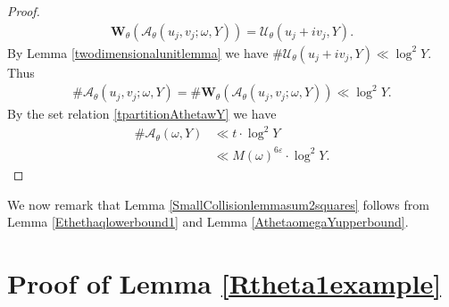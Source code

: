 \documentclass[12pt]{amsart}
\newcommand{\1}{\mathmybb{1}}
\begin{document}
\begin{proof}
\begin{align*}
\mathbf{W}_{\theta}(\mathcal{A}_{\theta}(u_{j},v_{j};\omega,Y)) = \mathcal{U}_{\theta}(u_{j}+iv_{j},Y).
\end{align*}
By Lemma \ref{twodimensionalunitlemma} we have $\#\mathcal{U}_{\theta}(u_{j}+iv_{j},Y) \ll \log^2 Y$. Thus
\begin{align*}
\# \mathcal{A}_{\theta}(u_{j},v_{j};\omega,Y) = \# \mathbf{W}_{\theta}(\mathcal{A}_{\theta}(u_{j},v_{j};\omega,Y)) \ll \log^2 Y.
\end{align*}
By the set relation \eqref{tpartitionAthetawY} we have
\begin{align*}
\# \mathcal{A}_{\theta}(\omega,Y) &\ll t\cdot \log^2 Y\\
&\ll M(\omega)^{6\varepsilon}\cdot \log^2 Y.
\end{align*}
\par \vspace{-\baselineskip} \qedhere
\end{proof}
We now remark that Lemma \ref{SmallCollisionlemmasum2squares} follows from Lemma \ref{Ethethaqlowerbound1} and Lemma \ref{AthetaomegaYupperbound}.
\section{Proof of Lemma \ref{Rtheta1example}}
\end{document}
